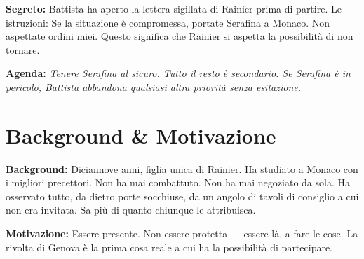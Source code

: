 \clearpage
\begin{secretbox}
\textbf{Segreto:} Battista ha aperto la lettera sigillata di Rainier prima di partire. Le istruzioni: \guillemotleft{}Se la situazione \`e compromessa, portate Serafina a Monaco. Non aspettate ordini miei.\guillemotright{} Questo significa che Rainier si aspetta la possibilit\`a di non tornare.

\medskip\noindent\textcolor{SecretRed}{\textbf{Agenda:}} \textit{Tenere Serafina al sicuro. Tutto il resto \`e secondario. Se Serafina \`e in pericolo, Battista abbandona qualsiasi altra priorit\`a senza esitazione.}
\end{secretbox}

\clearpage



\section*{Background \& Motivazione}
\begin{rulebox}{}
\textbf{Background:} Diciannove anni, figlia unica di Rainier. Ha studiato a Monaco con i migliori precettori. Non ha mai combattuto. Non ha mai negoziato da sola. Ha osservato tutto, da dietro porte socchiuse, da un angolo di tavoli di consiglio a cui non era invitata. Sa pi\`u di quanto chiunque le attribuisca.

\medskip\noindent\textcolor{GrimaldiPurple}{\textbf{Motivazione:}} Essere presente. Non essere protetta --- essere l\`a, a fare le cose. La rivolta di Genova \`e la prima cosa reale a cui ha la possibilit\`a di partecipare.
\end{rulebox}

